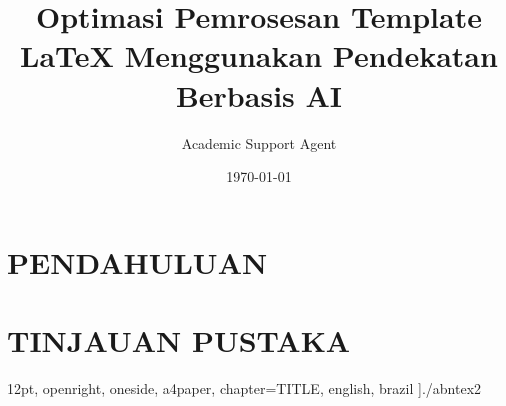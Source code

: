 \documentclass{./abntex2}
\title{Optimasi Pemrosesan Template LaTeX Menggunakan Pendekatan Berbasis AI}
\author{Academic Support Agent}
\date{\today}
\begin{document}
\maketitle

\begin{abstract}

\end{abstract}

\chapter{PENDAHULUAN}


\chapter{TINJAUAN PUSTAKA}


	12pt,				%
	openright,			%
    oneside,
	a4paper,			%
	chapter=TITLE,
	english,			%
	brazil				%
	]{./abntex2}

\usepackage{lmodern}		%
\usepackage[T1]{fontenc}	%
\usepackage[utf8]{inputenc}	%
\usepackage{indentfirst}	%
\usepackage{color}			%
\usepackage{graphicx}		%
\usepackage{microtype} 		%
\usepackage{setspace}       %
\usepackage{pdfpages}
		
\usepackage{lipsum} %

\usepackage[num,abnt-etal-list=0,bibjustif]{./abntex2cite} %
\end{document}
